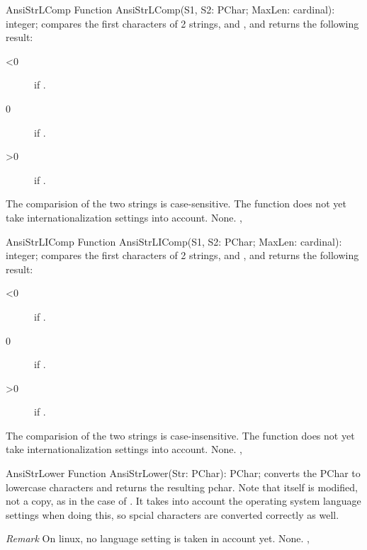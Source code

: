 

\begin{function}{AnsiStrLComp}
\Declaration
Function AnsiStrLComp(S1, S2: PChar; MaxLen: cardinal): integer;
\Description
{} compares the first  characters of
2  strings,  and , and returns the following
result:
\begin{description}
\item[<0]  if .
\item[0]  if .
\item[>0]  if .
\end{description}
The comparision of the two strings is case-sensitive.
The function does not yet take internationalization settings into account.
\Errors
None.
\SeeAlso
{}, 
\end{function}



\begin{function}{AnsiStrLIComp}
\Declaration
Function AnsiStrLIComp(S1, S2: PChar; MaxLen: cardinal): integer;
\Description
{} compares the first  characters of
2  strings,  and , and returns the following
result:
\begin{description}
\item[<0]  if .
\item[0]  if .
\item[>0]  if .
\end{description}
The comparision of the two strings is case-insensitive.
The function does not yet take internationalization settings into account.
\Errors
None.
\SeeAlso
{}, 
\end{function}
 




\begin{function}{AnsiStrLower}
\Declaration
Function AnsiStrLower(Str: PChar): PChar;
\Description
{} converts the PChar  to lowercase characters 
and returns the resulting pchar. Note that  itself is modified,
not a copy, as in the case of .
It takes into account the operating system language
settings when doing this, so spcial characters are converted correctly as
well.

{\em Remark} On linux, no language setting is taken in account yet.
\Errors
None.
\SeeAlso
{}, 
\end{function}

